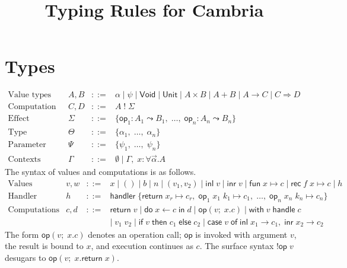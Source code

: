 \documentclass{article}
\title{Typing Rules for Cambria}
\author{}
\date{}
\theoremstyle{definition}
\theoremstyle{remark}
\newcommand{\void}{\mathsf{Void}}
\newcommand{\unit}{\mathsf{Unit}}
\newcommand{\tfun}[2]{#1 \to #2}
\newcommand{\tpair}[2]{#1 \times #2}
\newcommand{\teither}[2]{#1 + #2}
\newcommand{\thandler}[2]{#1 \Rightarrow #2}
\newcommand{\comp}[2]{#1\;!\;#2}
\newcommand{\op}{\mathsf{op}}
\newcommand{\ret}{\mathsf{return}\;}
\newcommand{\ddo}{\mathsf{do}\;}
\newcommand{\iin}{\;\mathsf{in}\;}
\newcommand{\iif}{\mathsf{if}\;}
\newcommand{\then}{\;\mathsf{then}\;}
\newcommand{\eelse}{\;\mathsf{else}\;}
\newcommand{\ccase}{\mathsf{case}\;}
\newcommand{\oof}{\;\mathsf{of}\;}
\newcommand{\inl}{\mathsf{inl}\;}
\newcommand{\inr}{\mathsf{inr}\;}
\newcommand{\fun}{\mathsf{fun}\;}
\newcommand{\rec}{\mathsf{rec}\;}
\newcommand{\hhandler}{\mathsf{handler}}
\newcommand{\with}{\mathsf{with}\;}
\newcommand{\handle}{\;\mathsf{handle}\;}
\newcommand{\G}{\Gamma}
\newcommand{\Sig}{\Sigma}
\begin{document}
\maketitle

\section{Types}

\[
\begin{array}{lrcl}
  \text{Value types}         & A, B   & ::= & \alpha \mid \psi \mid \void \mid \unit \mid \tpair{A}{B} \mid \teither{A}{B} \mid \tfun{A}{C} \mid \thandler{C}{D} \\[6pt]
  \text{Computation types}   & C, D   & ::= & \comp{A}{\Sig} \\[6pt]
  \text{Effect signatures}   & \Sig   & ::= & \{ \op_1 : A_1 \leadsto B_1,\; \ldots,\; \op_n : A_n \leadsto B_n \} \\[6pt]
  \text{Type variables}      & \Theta & ::= & \{ \alpha_1, \; \ldots, \; \alpha_n \} \\[6pt]
  \text{Parameter variables} & \Psi   & ::= & \{ \psi_1, \; \ldots, \; \psi_n \} \\[6pt]
  \text{Contexts}            & \G     & ::= & \emptyset \mid \G,\; x : \forall \vec{\alpha} . A
\end{array}
\]
The syntax of values and computations is as follows.
\[
\begin{array}{lrcl}
  \text{Values}       & v, w & ::= & x \mid () \mid b \mid n \mid (v_1, v_2) \mid \inl v \mid \inr v
                                     \mid \fun x \mapsto c \mid \rec f\;x \mapsto c \mid h \\[6pt]
  \text{Handler}      & h    & ::= &
    \hhandler\;\{
      \ret x_r \mapsto c_r,\;
      \op_1\; x_1\; k_1 \mapsto c_1,\;
      \ldots,\;
      \op_n\; x_n\; k_n \mapsto c_n
    \} \\[6pt]
  \text{Computations} & c, d & ::= & \ret v \mid \ddo x \leftarrow c \iin d \mid \op(v;\;x.c)
                                     \mid \with v \handle c \\[2pt]
                      &      &     & \mid\; v_1\;v_2 \mid \iif v \then c_1 \eelse c_2
                                     \mid \ccase v \oof \inl x_1 \to c_1,\;\inr x_2 \to c_2
\end{array}
\]
The form $\op(v;\;x.c)$ denotes an operation call; $\op$ is invoked with argument $v$, the result is bound to $x$, and execution continues as $c$.
The surface syntax ${!}\op\;v$ desugars to $\op(v;\;x.\ret x)$.
\end{document}
